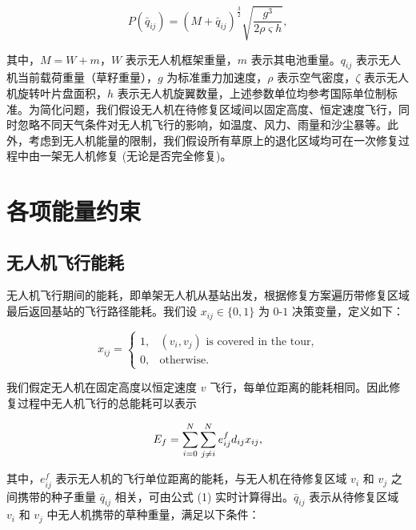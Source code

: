 \documentclass[AutoFakeBold]{LZUThesis}
\begin{document}
\begin{equation} \label{approximation-power-consumption}
	P(\bar{q}_{ij}) = (M + \bar{q}_{ij})^{\frac{3}{2}}\sqrt{\frac{g^3}{2 \rho \varsigma h}},
\end{equation}

其中，$M = W + m$，$W$ 表示无人机框架重量，$m$ 表示其电池重量。$q_{ij}$ 表示无人机当前载荷重量（草籽重量），$g$ 为标准重力加速度，$\rho$ 表示空气密度，$\zeta$ 表示无人机旋转叶片盘面积，$h$ 表示无人机旋翼数量，上述参数单位均参考国际单位制标准。为简化问题，我们假设无人机在待修复区域间以固定高度、恒定速度飞行，同时忽略不同天气条件对无人机飞行的影响，如温度、风力、雨量和沙尘暴等。此外，考虑到无人机能量的限制，我们假设所有草原上的退化区域均可在一次修复过程中由一架无人机修复 (无论是否完全修复)。

\section{各项能量约束}

\subsection{无人机飞行能耗}

无人机飞行期间的能耗，即单架无人机从基站出发，根据修复方案遍历带修复区域最后返回基站的飞行路径能耗。我们设 $x_{ij} \in \{0,1\}$ 为 $0$-$1$ 决策变量，定义如下：

\begin{equation}
	x_{ij} =
	\begin{cases}
		1, & \mbox{$(v_i,v_j)$ is covered in the tour,} \\
		0, & \mbox{otherwise}.
	\end{cases}
\end{equation}

我们假定无人机在固定高度以恒定速度 $v$ 飞行，每单位距离的能耗相同。因此修复过程中无人机飞行的总能耗可以表示

\begin{equation} \label{flight-energy}
	\begin{scriptsize}
		E_f =  \sum^N_{i=0}\sum^N_{j \neq i} e^f_{ij} d_{ij} x_{ij},
	\end{scriptsize}
\end{equation}

其中，$e^f_{ij}$ 表示无人机的飞行单位距离的能耗，与无人机在待修复区域 $v_i$ 和 $v_j$ 之间携带的种子重量 $\bar{q}_{ij}$ 相关，可由公式 (1) 实时计算得出。$\bar{q}_{ij}$ 表示从待修复区域 $v_i$ 和 $v_j$ 中无人机携带的草种重量，满足以下条件：
\end{document}
